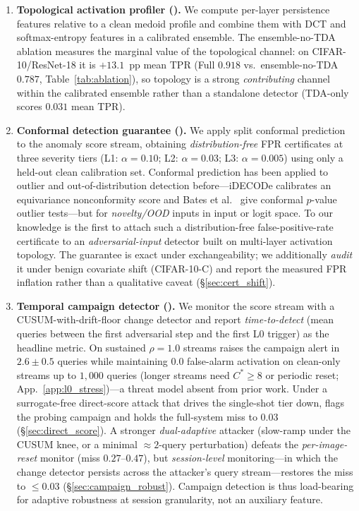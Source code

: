 \begin{enumerate}[leftmargin=*, label=\textbf{C\arabic*}]

\item \textbf{Topological activation profiler (\tamm).}
We compute per-layer persistence features relative to a clean medoid profile
and combine them with DCT and softmax-entropy features in a calibrated
ensemble. The ensemble-no-TDA ablation measures the marginal value of the
topological channel: on CIFAR-10/ResNet-18 it is $+13.1$~pp mean TPR
(Full $0.918$ vs.\ ensemble-no-TDA $0.787$, Table~\ref{tab:ablation}), so
topology is a strong \emph{contributing} channel within the calibrated
ensemble rather than a standalone detector (TDA-only scores $0.031$ mean TPR).

\item \textbf{Conformal detection guarantee (\cadg).}
We apply split conformal prediction to the anomaly score stream, obtaining 
\emph{distribution-free} FPR certificates at three severity tiers 
(L1: $\alpha{=}0.10$; L2: $\alpha{=}0.03$; L3: $\alpha{=}0.005$)
using only a held-out clean calibration set. Conformal prediction has been
applied to outlier and out-of-distribution detection before---iDECODe
\cite{kaur2022idecode} calibrates an equivariance nonconformity score and
Bates et al.\ \cite{bates2023outliers} give conformal $p$-value outlier
tests---but for \emph{novelty/OOD} inputs in input or logit space. To our
knowledge \prism is the first to attach such a distribution-free
false-positive-rate certificate to an \emph{adversarial-input} detector
built on multi-layer activation topology. The guarantee is exact under
exchangeability; we additionally \emph{audit} it under benign covariate
shift (CIFAR-10-C) and report the measured FPR inflation rather than a
qualitative caveat (\S\ref{sec:cert_shift}).

\item \textbf{Temporal campaign detector (\sacd).}
We monitor the score stream with a CUSUM-with-drift-floor change detector
and report \emph{time-to-detect} (mean queries between the first adversarial
step and the first L0 trigger) as the headline metric. On sustained
$\rho{=}1.0$ streams \sacd raises the campaign alert in $2.6 \pm 0.5$
queries while maintaining $0.0$ false-alarm activation on clean-only
streams up to $1{,}000$ queries (longer streams need $C^*{\geq}8$ or
periodic reset; App.~\ref{app:l0_stress})---a threat model absent from
prior work. Under a surrogate-free direct-score attack that drives the
single-shot tier down, \sacd flags the probing campaign and holds the
full-system miss to $0.03$ (\S\ref{sec:direct_score}). A stronger
\emph{dual-adaptive} attacker (slow-ramp under the CUSUM knee, or a minimal
${\approx}2$-query perturbation) defeats the \emph{per-image-reset} monitor
(miss $0.27$--$0.47$), but \emph{session-level} monitoring---in which the
change detector persists across the attacker's query stream---restores the
miss to ${\le}0.03$ (\S\ref{sec:campaign_robust}). Campaign detection is thus
load-bearing for adaptive robustness at session granularity, not an auxiliary
feature.


\end{enumerate}
